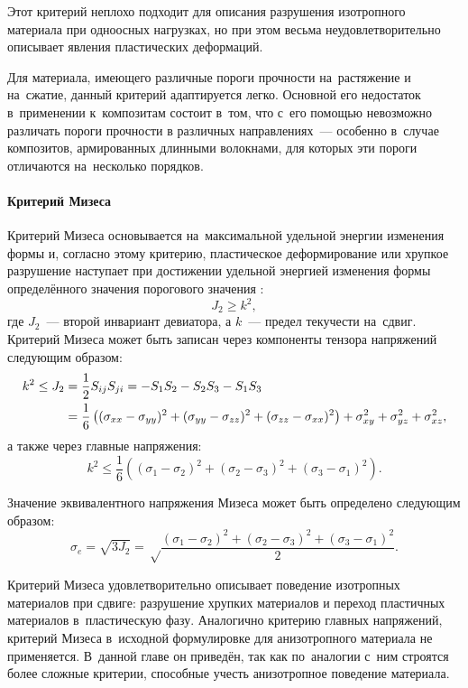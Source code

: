 \documentclass[thesis.tex]{subfiles}
\begin{document}
Этот критерий неплохо подходит для описания разрушения изотропного материала при одноосных нагрузках, но при этом весьма
неудовлетворительно описывает явления пластических деформаций.

Для материала, имеющего различные пороги прочности на~растяжение и на~сжатие, данный критерий адаптируется легко.
Основной его недостаток в~применении к~композитам состоит в~том, что с~его помощью невозможно различать пороги прочности
в различных направлениях~--- особенно в~случае композитов, армированных длинными волокнами, для которых эти пороги
отличаются на~несколько порядков.

\paragraph{Критерий Мизеса}
Критерий Мизеса основывается на~максимальной удельной энергии изменения формы \cite{ильюшин1948пластичность} и,
согласно этому критерию, пластическое деформирование или хрупкое разрушение  наступает при достижении
удельной энергией изменения формы определённого значения порогового значения \cite{иванов1990расчёт}:
\begin{equation}
    J_2 \geq k^2,
\end{equation}
где $J_2$~--- второй инвариант девиатора, а $k$~--- предел текучести на~сдвиг. Критерий Мизеса может быть записан через
компоненты тензора напряжений следующим образом:
\begin{align}
    k^2 \leq J_2 &= \frac{1}{2}S_{ij}S_{ji} = -S_1 S_2 - S_2 S_3 - S_1 S_3 \nonumber \\
                 &= \frac{1}{6}\left( (\sigma_{xx} - \sigma_{yy})^2 + (\sigma_{yy} - \sigma_{zz})^2 + (\sigma_{zz} - \sigma_{xx})^2 \right) +
                   \sigma_{xy}^2 + \sigma_{yz}^2 + \sigma_{xz}^2,
\end{align}
а также через главные напряжения:
\begin{equation}
    k^2 \leq \frac{1}{6}\left( (\sigma_1 - \sigma_2)^2 + (\sigma_2-\sigma_3)^2 + (\sigma_3-\sigma_1)^2 \right).
\end{equation}

Значение эквивалентного напряжения Мизеса может быть определено следующим образом:
\begin{equation}
    \sigma_e = \sqrt{3J_2} = \sqrt \frac{(\sigma_1 - \sigma_2)^2 + (\sigma_2-\sigma_3)^2 + (\sigma_3-\sigma_1)^2}{2}.
\end{equation}

Критерий Мизеса удовлетворительно описывает поведение изотропных материалов при сдвиге: разрушение хрупких материалов
и переход пластичных материалов в~пластическую фазу. Аналогично критерию главных напряжений, критерий Мизеса в~исходной
формулировке для анизотропного материала не применяется. В~данной главе он приведён, так как по~аналогии с~ним строятся
более сложные критерии, способные учесть анизотропное поведение материала.
\end{document}
